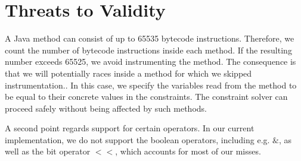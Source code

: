 \section{Threats to Validity}
A Java method can consist of up to 65535 bytecode instructions. Therefore, we count the number of bytecode instructions inside each method. If the resulting number exceeds 65525, we avoid instrumenting the method. The consequence is that we will potentially races inside a method for which we skipped instrumentation.. In this case, we specify the variables read from the method to be equal to their concrete values in the constraints. The constraint solver can proceed safely without being affected by such methods.

A second point regards support for certain operators. In our current implementation, we do not support the boolean operators, including e.g. $\&$, as well as the bit operator $<<$, which accounts for most of our misses.



